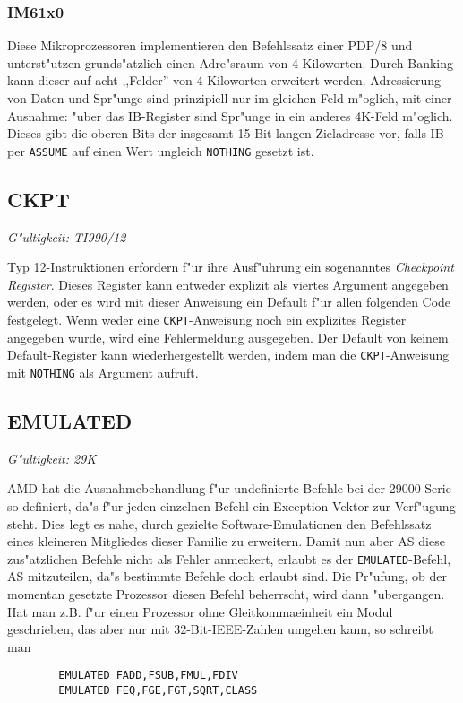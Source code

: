 \documentclass[12pt,a4paper,twoside]{report}
\makeatletter
\newcommand{\tty}[1]{{\tt #1}}
\newcommand{\ttindex}[1]{\index{#1@{\tt #1}}}
\makeatother
\begin{document}

\subsubsection{IM61x0}

Diese Mikroprozessoren implementieren den Befehlssatz einer PDP/8 und unterst"utzen
grunds"atzlich einen Adre"sraum von 4 Kiloworten.  Durch Banking kann dieser
auf acht ,,Felder'' von 4 Kiloworten erweitert werden.  Adressierung von Daten
und Spr"unge sind prinzipiell nur im gleichen Feld m"oglich, mit einer Ausnahme:
"uber das IB-Register sind Spr"unge in ein anderes 4K-Feld m"oglich.  Dieses gibt
die oberen Bits der insgesamt 15 Bit langen Zieladresse vor, falls IB per \tty{ASSUME}
auf einen Wert ungleich \tty{NOTHING} gesetzt ist.


\subsection{CKPT}
\ttindex{CKPT}

{\em G"ultigkeit: TI990/12}

Typ 12-Instruktionen erfordern f"ur ihre Ausf"uhrung ein sogenanntes {\em Checkpoint
Register}.  Dieses Register kann entweder explizit als viertes Argument angegeben
werden, oder es wird mit dieser Anweisung ein Default f"ur allen folgenden Code
festgelegt.  Wenn weder eine \tty{CKPT}-Anweisung noch ein explizites Register
angegeben wurde, wird eine Fehlermeldung ausgegeben. Der Default von keinem
Default-Register kann wiederhergestellt werden, indem man die \tty{CKPT}-Anweisung
mit {\tt NOTHING} als Argument aufruft.


\subsection{EMULATED}
\ttindex{EMULATED}

{\em G"ultigkeit: 29K}

AMD hat die Ausnahmebehandlung f"ur undefinierte Befehle bei der
29000-Serie so definiert, da"s f"ur jeden einzelnen Befehl ein
Exception-Vektor zur Verf"ugung steht.  Dies legt es nahe, durch
gezielte Software-Emulationen den Befehlssatz eines kleineren
Mitgliedes dieser Familie zu erweitern.  Damit nun aber AS diese
zus"atzlichen Befehle nicht als Fehler anmeckert, erlaubt es der
\tty{EMULATED}-Befehl, AS mitzuteilen, da"s bestimmte Befehle doch
erlaubt sind.  Die Pr"ufung, ob der momentan gesetzte Prozessor
diesen Befehl beherrscht, wird dann "ubergangen.  Hat man z.B. f"ur
einen Prozessor ohne Gleitkommaeinheit ein Modul geschrieben, das
aber nur mit 32-Bit-IEEE-Zahlen umgehen kann, so schreibt man
\begin{verbatim}
        EMULATED FADD,FSUB,FMUL,FDIV
        EMULATED FEQ,FGE,FGT,SQRT,CLASS
\end{verbatim}
\end{document}
